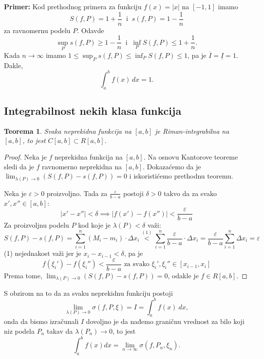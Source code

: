 \documentclass[a4paper,12pt,twoside]{report}
\newtheorem{theorem}{Teorema}[section]
\numberwithin{algorithm}{section}
\begin{document}
\noindent \textbf{Primer:} Kod prethodnog primera za funkciju $f(x) = |x|$ na $[-1, 1]$ imamo 
\[S(f, P) = 1 + \frac{1}{n} \;\;\text{i}\;\; s(f, P) = 1 - \frac{1}{n}\] za ravnomernu podelu $P$.
Odavde \[ \sup_P s(f, P) \geq 1 - \frac{1}{n} \;\;\text{i}\;\; \inf_P S(f, P) \leq 1 + \frac{1}{n}.\]
Kada $n \to \infty$ imamo $\displaystyle 1 \leq \sup_P s(f, P) \leq \inf_P S(f, P) \leq 1$, pa je $\overline{I} = \underline{I} = 1$.
Dakle, \[\int_a^b f(x) \, dx = 1.\]

\newpage

\subsection{Integrabilnost nekih klasa funkcija}

\begin{theorem}
    Svaka neprekidna funkcija na \([a, b]\) je Riman-integrabilna na \([a, b]\), to jest \(C[a, b] \subset R[a, b]\).
\end{theorem}

\begin{proof}
    Neka je \(f\) neprekidna funkcija na \([a, b]\). Na osnovu Kantorove teoreme sledi da je \(f\) ravnomerno neprekidna na \([a, b]\). Dokazaćemo da je \(\lim_{\lambda(P) \to 0} (S(f, P) - s(f, P)) = 0\) i iskoristićemo prethodnu teoremu.
    
    Neka je \(\varepsilon > 0\) proizvoljno. Tada za \(\frac{\varepsilon}{b-a}\) postoji \(\delta > 0\) takvo da za svako \(x', x'' \in [a, b]\):
    \[
        |x' - x''| < \delta \implies |f(x') - f(x'')| < \frac{\varepsilon}{b-a}
    \]
    Za proizvoljnu podelu \(P\) kod koje je \(\lambda(P) < \delta\) važi: 
    \[
        S(f, P) - s(f, P) = \sum_{i=1}^n (M_i - m_i) \cdot \Delta x_i \overset{(1)}{<} \sum_{i=1}^n \frac{\varepsilon}{b-a} \cdot \Delta x_i = \frac{\varepsilon}{b-a} \sum_{i=1}^n \Delta x_i = \varepsilon
    \]
    (1) nejednakost važi jer je \(x_i - x_{i-1} < \delta\), pa je
    \[
        f(\xi_i') - f(\xi_i'') < \frac{\varepsilon}{b-a} \text{ za svako } \xi_i', \xi_i'' \in [x_{i-1}, x_i]
    \]
    Prema tome, \(\lim_{\lambda(P) \to 0} (S(f, P) - s(f, P)) = 0\), odakle je \(f \in R[a, b]\).
\end{proof}
    
    S obzirom na to da za svaku neprekidnu funkciju postoji \[\lim_{\lambda(P) \to 0} \sigma(f, P, \xi) = I = \int_a^b f(x) \ dx,\] onda da bismo izračunali \(I\) dovoljno je da nađemo graničnu vrednost za bilo koji niz podela \(P_n\) takav da \(\lambda(P_n) \to 0\), to jest \[\int_a^b f(x) dx = \lim_{n \to \infty} \sigma(f, P_n, \xi_n).\]
    
\end{document}
